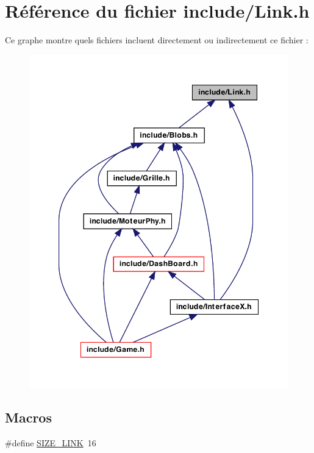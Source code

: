 \hypertarget{a00030}{
\section{Référence du fichier include/Link.h}
\label{a00030}
}
Ce graphe montre quels fichiers incluent directement ou indirectement ce fichier :
\nopagebreak
\begin{figure}[H]
\begin{center}
\leavevmode
\includegraphics[width=349pt]{a00062}
\end{center}
\end{figure}
\subsection*{Macros}
\begin{DoxyCompactItemize}
\item 
\#define \hyperlink{a00030_a25ca9f82539dd0aa9d5028a39e9c9e5c}{SIZE\_\-LINK}~16
\end{DoxyCompactItemize}

